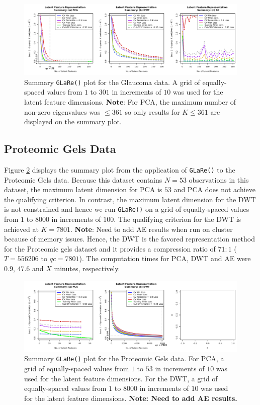 \begin{figure}
    \centering
    \includegraphics[width=1\textwidth]{figures/eye-results.pdf}
    \caption{Summary \texttt{GLaRe()} plot for the Glaucoma data. A grid of equally-spaced values from $1$ to $301$ in increments of $10$ was used for the latent feature dimensions. \textbf{Note}: For PCA, the maximum number of non-zero eigenvalues was $\leq361$ so only results for $K \leq 361$ are displayed on the summary plot.}
    \label{fig:eye-results}
\end{figure}

\subsection{Proteomic Gels Data}\label{sec:gels-reults}

Figure \ref{fig:gels-results} displays the summary plot from the application of \texttt{GLaRe()} to the Proteomic Gels data.
Because this dataset contains $N=53$ observations in this dataset, the maximum latent dimension for PCA is $53$ and PCA does not achieve the qualifying criterion.
In contrast, the maximum latent dimension for the DWT is not constrained and hence we run \texttt{GLaRe()} on a grid of equally-spaced values from $1$ to $8000$ in increments of $100$.
The qualifying criterion for the DWT is achieved at $K=7801$.
{\color{purple}\textbf{Note}: Need to add AE results when run on cluster because of memory issues.}
Hence, the DWT is the favored representation method for the Proteomic gels dataset and it provides a compression ratio of $71:1$ ($T = 556206$ to $qc = 7801$).
The computation times for PCA, DWT and AE were $0.9$, $47.6$ and {\color{purple}$X$} minutes, respectively.


\begin{figure}
    \centering
    \includegraphics[width=1\linewidth]{figures/gels-results.pdf}
    \caption{Summary \texttt{GLaRe()} plot for the Proteomic Gels data. For PCA, a grid of equally-spaced values from $1$ to $53$ in increments of $10$ was used for the latent feature dimensions.
    For the DWT,  a grid of equally-spaced values from $1$ to $8000$ in increments of $10$ was used for the latent feature dimensions. {\color{purple} \textbf{Note: Need to add AE results.}}}
    \label{fig:gels-results}
\end{figure}


